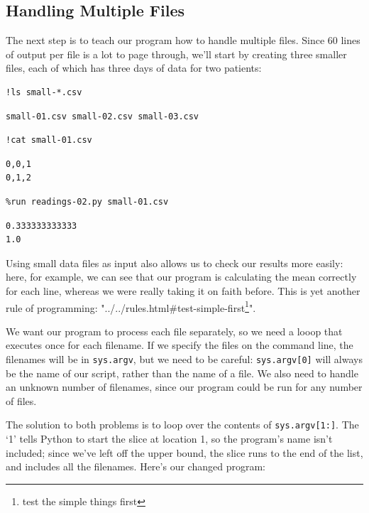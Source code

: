 \documentclass[]{book}
\newcommand{\urlfoot}[2]{{#1}\footnote{#2}}
\begin{document}
\subsection{Handling Multiple Files}

The next step is to teach our program how to handle multiple files.
Since 60 lines of output per file is a lot to page through, we'll start
by creating three smaller files, each of which has three days of data
for two patients:

\begin{verbatim}
!ls small-*.csv
\end{verbatim}

\begin{verbatim}
small-01.csv small-02.csv small-03.csv
\end{verbatim}

\begin{verbatim}
!cat small-01.csv
\end{verbatim}

\begin{verbatim}
0,0,1
0,1,2
\end{verbatim}

\begin{verbatim}
%run readings-02.py small-01.csv
\end{verbatim}

\begin{verbatim}
0.333333333333
1.0
\end{verbatim}

Using small data files as input also allows us to check our results more
easily: here, for example, we can see that our program is calculating
the mean correctly for each line, whereas we were really taking it on
faith before. This is yet another rule of programming:
"\urlfoot{../../rules.html\#test-simple-first}{test the simple things
first}".

We want our program to process each file separately, so we need a looop
that executes once for each filename. If we specify the files on the
command line, the filenames will be in \texttt{sys.argv}, but we need to
be careful: \texttt{sys.argv{[}0{]}} will always be the name of our
script, rather than the name of a file. We also need to handle an
unknown number of filenames, since our program could be run for any
number of files.

The solution to both problems is to loop over the contents of
\texttt{sys.argv{[}1:{]}}. The `1' tells Python to start the slice at
location 1, so the program's name isn't included; since we've left off
the upper bound, the slice runs to the end of the list, and includes all
the filenames. Here's our changed program:
\end{document}
